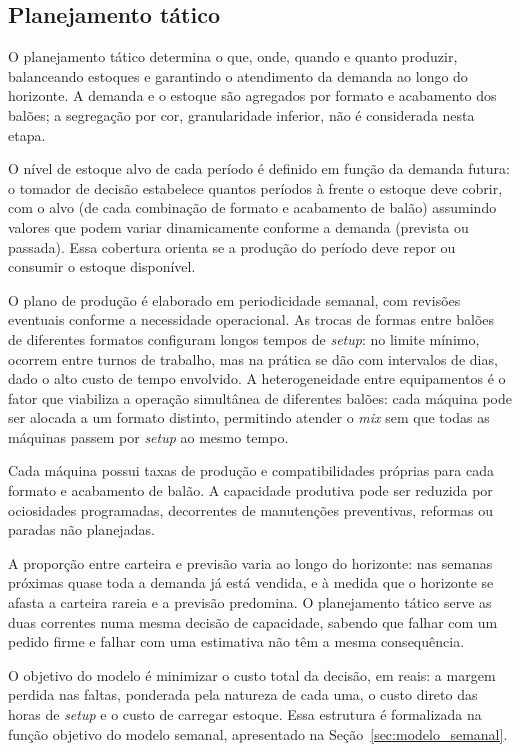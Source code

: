 \documentclass[fleqn,12pt,a4paper]{article}
\begin{document}
\subsection{Planejamento tático}

O planejamento tático determina o que, onde, quando e quanto produzir, balanceando estoques e garantindo o atendimento da demanda ao longo do horizonte. A demanda e o estoque são agregados por formato e acabamento dos balões; a segregação por cor, granularidade inferior, não é considerada nesta etapa.

O nível de estoque alvo de cada período é definido em função da demanda futura: o tomador de decisão estabelece quantos períodos à frente o estoque deve cobrir, com o alvo (de cada combinação de formato e acabamento de balão) assumindo valores que podem variar dinamicamente conforme a demanda (prevista ou passada). Essa cobertura orienta se a produção do período deve repor ou consumir o estoque disponível.

O plano de produção é elaborado em periodicidade semanal, com revisões eventuais conforme a necessidade operacional. As trocas de formas entre balões de diferentes formatos configuram longos tempos de \textit{setup}: no limite mínimo, ocorrem entre turnos de trabalho, mas na prática se dão com intervalos de dias, dado o alto custo de tempo envolvido. A heterogeneidade entre equipamentos é o fator que viabiliza a operação simultânea de diferentes balões: cada máquina pode ser alocada a um formato distinto, permitindo atender o \textit{mix} sem que todas as máquinas passem por \textit{setup} ao mesmo tempo.

Cada máquina possui taxas de produção e compatibilidades próprias para cada formato e acabamento de balão. A capacidade produtiva pode ser reduzida por ociosidades programadas, decorrentes de manutenções preventivas, reformas ou paradas não planejadas.

A proporção entre carteira e previsão varia ao longo do horizonte: nas semanas próximas quase toda a demanda já está vendida, e à medida que o horizonte se afasta a carteira rareia e a previsão predomina. O planejamento tático serve as duas correntes numa mesma decisão de capacidade, sabendo que falhar com um pedido firme e falhar com uma estimativa não têm a mesma consequência.

O objetivo do modelo é minimizar o custo total da decisão, em reais: a margem perdida nas faltas, ponderada pela natureza de cada uma, o custo direto das horas de \textit{setup} e o custo de carregar estoque. Essa estrutura é formalizada na função objetivo do modelo semanal, apresentado na Seção~\ref{sec:modelo_semanal}.
\end{document}
